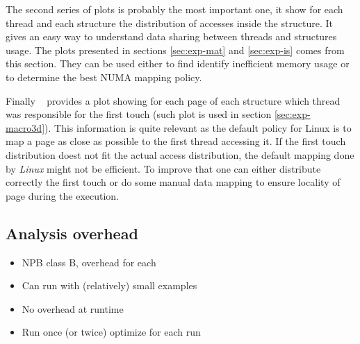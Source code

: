 The second series of plots is probably the most important one, it show for
each thread and each structure the distribution of accesses inside the
structure. It gives an easy way to understand data sharing between threads and
structures usage. The plots presented in sections \ref{sec:exp-mat} and
\ref{sec:exp-is} comes from this section. They can be used either to
find identify inefficient memory usage or to determine the best NUMA mapping
policy.

Finally \TABARNAC~ provides a plot showing for each page of each structure
which thread was responsible for the first touch (such plot is used in section
\ref{sec:exp-macro3d}). This information is quite relevant as the default
policy for Linux is to map a page as close as possible to the first thread
accessing it. If the first touch distribution doest not fit the actual access
distribution, the default mapping done by \emph{Linux} might not be efficient.
To improve that one can either distribute correctly the first touch or do some
manual data mapping to ensure locality of page during the execution.

\subsection{Analysis overhead}
\label{sec:expe-overhead}
\begin{itemize}
    \item NPB class B, overhead for each
    \item Can run with (relatively) small  examples
    \item No overhead at runtime
    \item Run once (or twice) optimize for each run
\end{itemize}
